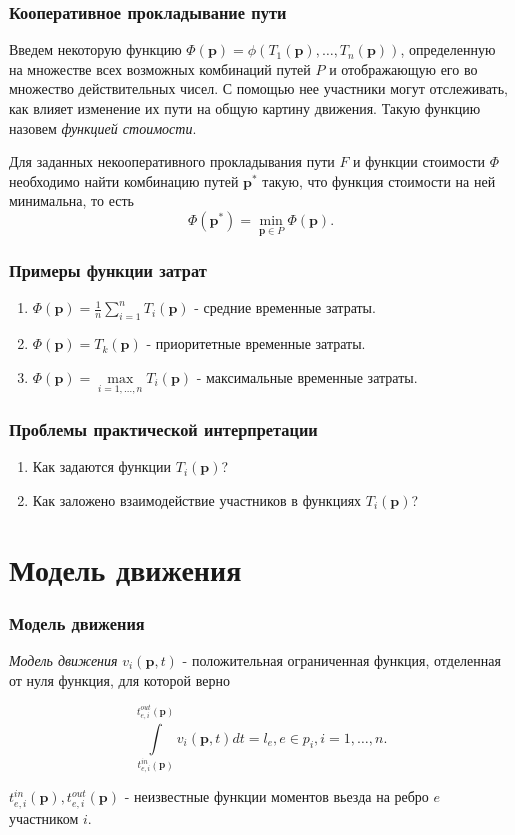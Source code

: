 \documentclass{beamer}
\DeclareMathOperator*{\minn}{min}
\begin{document}
\begin{frame}\frametitle{Кооперативное прокладывание пути}
	Введем некоторую функцию $\Phi (\textbf{p}) = \phi (T_1 (\textbf{p}), \ldots, T_n(\textbf{p}))$, определенную на множестве всех возможных комбинаций путей $P$ и отображающую его во множество действительных чисел. С помощью нее участники могут отслеживать, как влияет изменение их пути на общую картину движения. Такую функцию назовем \textit{функцией стоимости}.
	
	\bigskip
	Для заданных некооперативного прокладывания пути $F$ и функции стоимости $\Phi$ необходимо найти комбинацию путей $\textbf{p}^*$ такую, что функция стоимости на ней минимальна, то есть
	\begin{equation}
		\Phi (\textbf{p}^*) = \minn\limits_{ \textbf{p} \in P} \Phi (\textbf{p}).
	\end{equation}
	
\end{frame}

\begin{frame}\frametitle{Примеры функции затрат}
	\begin{enumerate}
		\item  $\Phi (\textbf{p}) = \frac{1}{n}\sum\limits_{i = 1}^n T_i (\textbf{p})$ - средние временные затраты. 
		\item  $\Phi (\textbf{p}) =  T_k (\textbf{p})$ - приоритетные временные затраты.
		\item  $\Phi (\textbf{p}) = \max\limits_{i = 1, \ldots, n} T_i (\textbf{p})$ - максимальные временные затраты.
	\end{enumerate}
\end{frame}

\begin{frame}\frametitle{Проблемы практической интерпретации}
	\begin{enumerate}
		\item Как задаются функции $T_i(\textbf{p})$?
		\item Как заложено взаимодействие участников в функциях $T_i(\textbf{p})$?
	\end{enumerate}
\end{frame}


\section{Модель движения}

\begin{frame}\frametitle{Модель движения}
\textit{Модель движения} $v_i(\textbf{p}, t)$ - положительная ограниченная функция, отделенная от нуля функция, для которой верно

$$	\int\limits_{t_{e, i}^{in}(\textbf{p})}^{t_{e, i}^{out}(\textbf{p})} v_i(\textbf{p}, t) dt = l_e, e \in p_i, i = 1, \dots, n.$$

$t_{e, i}^{in}(\textbf{p}), t_{e, i}^{out}(\textbf{p})$ - неизвестные функции моментов вьезда на ребро $e$ участником $i$.
\end{frame}
\end{document}

